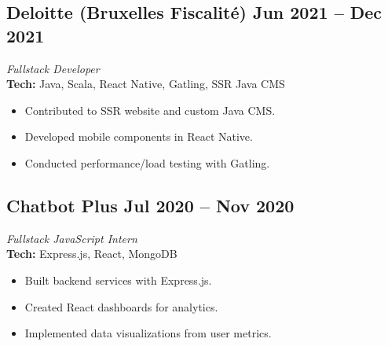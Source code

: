 \documentclass[11pt,a4paper]{article}
\begin{document}
\begin{paracol}{2}
\subsection{Deloitte (Bruxelles Fiscalité) \hfill Jun 2021 -- Dec 2021}
\textit{Fullstack Developer} \\
\textbf{Tech:} Java, Scala, React Native, Gatling, SSR Java CMS
\begin{itemize}
    \item Contributed to SSR website and custom Java CMS.
    \item Developed mobile components in React Native.
    \item Conducted performance/load testing with Gatling.
\end{itemize}

\subsection{Chatbot Plus \hfill Jul 2020 -- Nov 2020}
\textit{Fullstack JavaScript Intern} \\
\textbf{Tech:} Express.js, React, MongoDB
\begin{itemize}
    \item Built backend services with Express.js.
    \item Created React dashboards for analytics.
    \item Implemented data visualizations from user metrics.
\end{itemize}

\end{paracol}

\newpage
\end{document}
